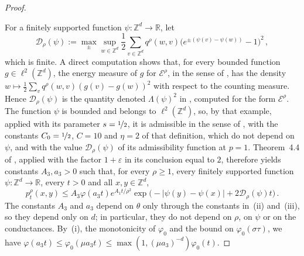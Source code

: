 \documentclass[11pt]{amsart}
\numberwithin{equation}{section}
\newcommand{\Z}{\mathbb{Z}}
\newcommand{\R}{\mathbb{R}}
\newcommand{\nf}{\nicefrac}
\begin{document}
\begin{proof}
\begin{enumerate}
\end{enumerate}
For a finitely supported function $\psi \colon \Z^d \to \R$, let
\begin{equation*}
    \mathcal{D}_\rho(\psi) := \max_{\pm} \sup_{w \in \Z^d} \frac12 \sum_{v \in \Z^d} q^\rho(w, v) \bigl( e^{\pm (\psi(v) - \psi(w))} - 1 \bigr)^2\,,
\end{equation*}
which is finite.
A direct computation shows that, for every bounded function $g \in \ell^2(\Z^d)$, the energy measure of $g$ for $\mathcal{E}^\rho$, in the sense of \citet[Section~2.1]{ChenKimKumagaiWang2021}, has the density $w \mapsto \frac12 \sum_{v} q^\rho(w, v) (g(v) - g(w))^2$ with respect to the counting measure.
Hence $\mathcal{D}_\rho(\psi)$ is the quantity denoted $\Lambda(\psi)^2$ in \citet[Example~4.3]{ChenKimKumagaiWang2021}, computed for the form $\mathcal{E}^\rho$.
The function $\psi$ is bounded and belongs to $\ell^2(\Z^d)$, so, by that example, applied with its parameter $s = \nf12$, it is admissible in the sense of \citet[Definition~4.1]{ChenKimKumagaiWang2021}, with the constants $C_0 = \nf12$, $C = 10$ and $\eta = 2$ of that definition, which do not depend on $\psi$, and with the value $\mathcal{D}_\rho(\psi)$ of its admissibility function at $p = 1$.
Theorem~4.4 of \citet{ChenKimKumagaiWang2021}, applied with the factor $1 + \varepsilon$ in its conclusion equal to $2$, therefore yields constants $A_3, a_3 > 0$ such that, for every $\rho \geq 1$, every finitely supported function $\psi \colon \Z^d \to \R$, every $t > 0$ and all $x, y \in \Z^d$,
\begin{equation*}
    p^\rho_t(x,y) \leq A_3 \varphi(a_3 t) e^{A_1 t / \rho^2} \exp \bigl( - |\psi(y) - \psi(x)| + 2 \mathcal{D}_\rho(\psi) t \bigr)\,.
\end{equation*}
The constants $A_3$ and $a_3$ depend on $\theta$ only through the constants in~(ii) and~(iii), so they depend only on $d$; in particular, they do not depend on $\rho$, on $\psi$ or on the conductances.
By~(i), the monotonicity of $\varphi_0$ and the bound on $\varphi_0(\sigma \tau)$, we have $\varphi(a_3 t) \leq \varphi_0(\mu a_3 t) \leq \max(1, (\mu a_3)^{-d}) \varphi_0(t)$.


\end{proof}
\end{document}
